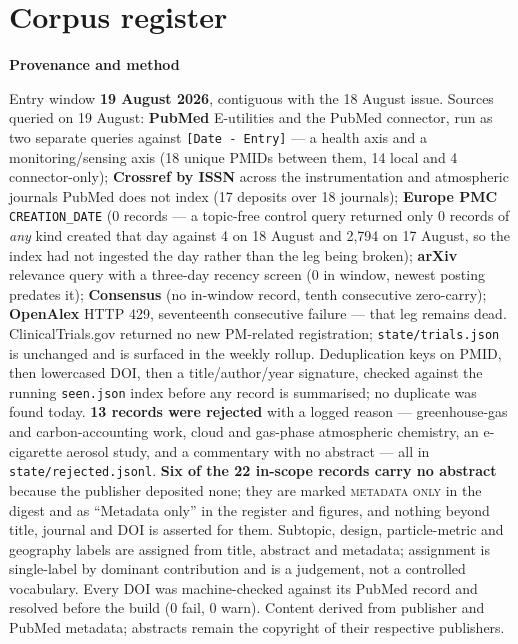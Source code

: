 \documentclass[10pt]{article}
\begin{document}
\clearpage

\section*{\sffamily\bfseries\color{Deep}Corpus register}
\vspace{-1.5mm}{\color{Amber}\rule{\linewidth}{1.1pt}}\vspace{2.5mm}



\vspace{4mm}
\begin{keybox}
{\sffamily\bfseries\footnotesize\color{Deep}Provenance and method}\\[1.2mm]
{\fontsize{7.2}{8.8}\selectfont
Entry window \textbf{19 August 2026}, contiguous with the 18 August issue. Sources queried
on 19 August: \textbf{PubMed} E-utilities and the PubMed connector, run as two separate
queries against \texttt{[Date - Entry]} --- a health axis and a monitoring/sensing axis
(18 unique PMIDs between them, 14 local and 4 connector-only);
\textbf{Crossref by ISSN} across the instrumentation and atmospheric journals PubMed does not
index (17 deposits over 18 journals); \textbf{Europe PMC} \texttt{CREATION\_DATE}
(0 records --- a topic-free control query returned only 0 records of \emph{any} kind created
that day against 4 on 18 August and 2{,}794 on 17 August, so the index had not ingested the
day rather than the leg being broken); \textbf{arXiv} relevance query with a three-day
recency screen (0 in window, newest posting predates it); \textbf{Consensus}
(no in-window record, tenth consecutive zero-carry); \textbf{OpenAlex} HTTP 429, seventeenth
consecutive failure --- that leg remains dead. ClinicalTrials.gov returned no new PM-related
registration; \texttt{state/trials.json} is unchanged and is surfaced in the weekly rollup.
Deduplication keys on PMID, then lowercased DOI, then a title/author/year signature, checked
against the running \texttt{seen.json} index before any record is summarised; no duplicate
was found today. \textbf{13 records were rejected} with a logged reason --- greenhouse-gas and
carbon-accounting work, cloud and gas-phase atmospheric chemistry, an e-cigarette aerosol
study, and a commentary with no abstract --- all in \texttt{state/rejected.jsonl}.
\textbf{Six of the 22 in-scope records carry no abstract} because the publisher deposited
none; they are marked \textsc{metadata only} in the digest and as ``Metadata only'' in the
register and figures, and nothing beyond title, journal and DOI is asserted for them.
Subtopic, design, particle-metric and geography labels are assigned from title, abstract and
metadata; assignment is single-label by dominant contribution and is a judgement, not a
controlled vocabulary. Every DOI was machine-checked against its PubMed record and resolved
before the build (0 fail, 0 warn). Content derived from publisher and PubMed metadata;
abstracts remain the copyright of their respective publishers.\par}
\end{keybox}
\end{document}
